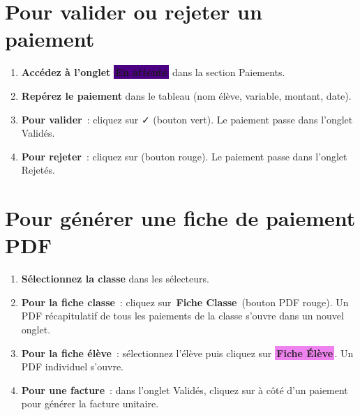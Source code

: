 \documentclass[12pt,a4paper]{report}
\newcommand{\onglet}[1]{{\colorbox{indigo}{\small\sffamily\bfseries\color{white}\,#1\,}}}
\newcommand{\btnviolet}[1]{{\colorbox{violet}{\small\sffamily\bfseries\color{white}\,#1\,}}}
\newcommand{\btnrose}[1]{{\colorbox{rose}{\small\sffamily\bfseries\color{white}\,#1\,}}}
\begin{document}
\section{Pour valider ou rejeter un paiement}

\begin{etape}[title=Proc\'edure : Valider / Rejeter]
\begin{enumerate}[leftmargin=1.5cm,label=\textbf{\arabic*.},itemsep=10pt]
  \item \textbf{Acc\'edez \`a l'onglet} \onglet{En attente} dans la section Paiements.
  \item \textbf{Rep\'erez le paiement} dans le tableau (nom \'el\`eve, variable, montant, date).
  \item \textbf{Pour valider}~: cliquez sur \textcolor{emerald}{\faCheck} (bouton vert). Le paiement passe dans l'onglet Valid\'es.
  \item \textbf{Pour rejeter}~: cliquez sur \textcolor{rose}{\faTimes} (bouton rouge). Le paiement passe dans l'onglet Rejet\'es.
\end{enumerate}
\end{etape}

\section{Pour g\'en\'erer une fiche de paiement PDF}

\begin{etape}[title=Proc\'edure : Exporter les fiches PDF]
\begin{enumerate}[leftmargin=1.5cm,label=\textbf{\arabic*.},itemsep=10pt]
  \item \textbf{S\'electionnez la classe} dans les s\'electeurs.
  \item \textbf{Pour la fiche classe}~: cliquez sur \btnrose{Fiche Classe} (bouton PDF rouge). Un PDF r\'ecapitulatif de tous les paiements de la classe s'ouvre dans un nouvel onglet.
  \item \textbf{Pour la fiche \'el\`eve}~: s\'electionnez l'\'el\`eve puis cliquez sur \btnviolet{Fiche \'El\`eve}. Un PDF individuel s'ouvre.
  \item \textbf{Pour une facture}~: dans l'onglet Valid\'es, cliquez sur \textcolor{rose}{\faFilePdf} \`a c\^ot\'e d'un paiement pour g\'en\'erer la facture unitaire.
\end{enumerate}
\end{etape}

\newpage
\end{document}
